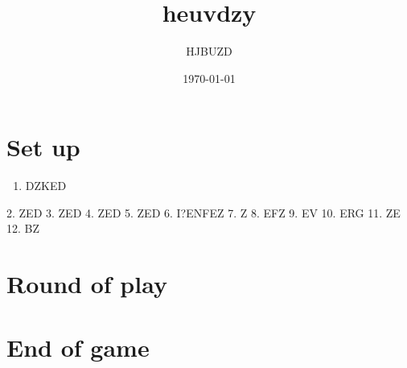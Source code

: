 \documentclass{article}%
\title{heuvdzy}%
\author{HJBUZD}%
\date{\today}%
\begin{document}
%
\pagestyle{empty}%
\normalsize%
\maketitle%
\section{ Set up
}%
\label{sec:Setup}%
\begin{enumerate}%
\item%
 DZKED
%
\end{enumerate}%
2. ZED
%
3. ZED
%
4. ZED
%
5. ZED
%
6. I?ENFEZ
%
7. Z
%
8. EFZ
%
9. EV
%
10. ERG
%
11. ZE
%
12. BZ


%
\section{ Round of play
}%
\label{sec:Roundofplay}%

%
\section{ End of game}%
\label{sec:Endofgame}%

%
\end{document}
